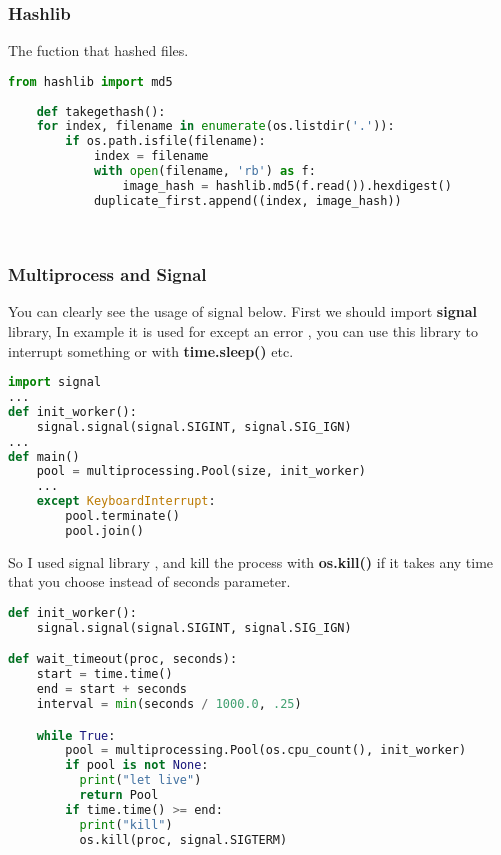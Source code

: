 \documentclass[onecolumn]{article}
\begin{document}
\subsubsection{Hashlib}

The fuction that hashed files.

\begin{lstlisting}[language=Python, caption=Hash Generator Function]
    from hashlib import md5 
    
    def takegethash():  
    for index, filename in enumerate(os.listdir('.')):
        if os.path.isfile(filename):
            index = filename
            with open(filename, 'rb') as f:
                image_hash = hashlib.md5(f.read()).hexdigest()
            duplicate_first.append((index, image_hash))

   
\end{lstlisting}



\subsubsection{Multiprocess and Signal}

You can clearly see the usage of signal below. First we should import \textbf{signal }library,  In example it is used for except an error , you can use this library to interrupt something or with\textbf{ time.sleep() }etc. 

\begin{lstlisting}[language=Python, caption=Multiprocess and Signal Example]
import signal
...
def init_worker():
    signal.signal(signal.SIGINT, signal.SIG_IGN)
...
def main()
    pool = multiprocessing.Pool(size, init_worker)
    ...
    except KeyboardInterrupt:
        pool.terminate()
        pool.join()
\end{lstlisting}

So I used signal library , and kill the process with \textbf{os.kill() }  if it takes any time that you choose instead of seconds parameter. 


\begin{lstlisting}[language=Python, caption=Multiprocess and Signal Example]
def init_worker():
    signal.signal(signal.SIGINT, signal.SIG_IGN)

def wait_timeout(proc, seconds):
    start = time.time()
    end = start + seconds
    interval = min(seconds / 1000.0, .25)

    while True:
        pool = multiprocessing.Pool(os.cpu_count(), init_worker)
        if pool is not None:
          print("let live")
          return Pool
        if time.time() >= end:
          print("kill")
          os.kill(proc, signal.SIGTERM)
          \end{lstlisting}
\end{document}
